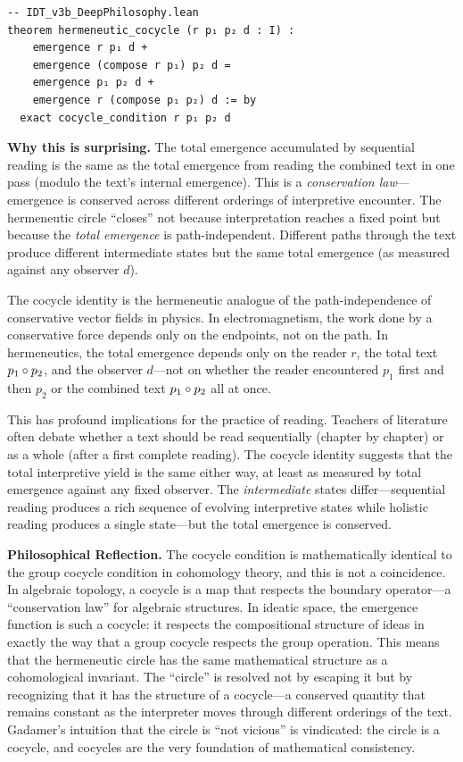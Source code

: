 \begin{lstlisting}
-- IDT_v3b_DeepPhilosophy.lean
theorem hermeneutic_cocycle (r p₁ p₂ d : I) :
    emergence r p₁ d +
    emergence (compose r p₁) p₂ d =
    emergence p₁ p₂ d +
    emergence r (compose p₁ p₂) d := by
  exact cocycle_condition r p₁ p₂ d
\end{lstlisting}

\begin{surprisebox}
\textbf{Why this is surprising.} The total emergence accumulated by
sequential reading is the same as the total emergence from reading the
combined text in one pass (modulo the text's internal emergence). This
is a \emph{conservation law}---emergence is conserved across different
orderings of interpretive encounter. The hermeneutic circle ``closes''
not because interpretation reaches a fixed point but because the
\emph{total emergence} is path-independent. Different paths through
the text produce different intermediate states but the same total
emergence (as measured against any observer $d$).
\end{surprisebox}

The cocycle identity is the hermeneutic analogue of the path-independence
of conservative vector fields in physics. In electromagnetism, the work
done by a conservative force depends only on the endpoints, not on the
path. In hermeneutics, the total emergence depends only on the reader
$r$, the total text $p_1 \circ p_2$, and the observer $d$---not on
whether the reader encountered $p_1$ first and then $p_2$ or the
combined text $p_1 \circ p_2$ all at once.

This has profound implications for the practice of reading. Teachers of
literature often debate whether a text should be read sequentially
(chapter by chapter) or as a whole (after a first complete reading).
The cocycle identity suggests that the total interpretive yield is the
same either way, at least as measured by total emergence against any
fixed observer. The \emph{intermediate} states differ---sequential
reading produces a rich sequence of evolving interpretive states while
holistic reading produces a single state---but the total emergence is
conserved.

\begin{reflectionbox}
\textbf{Philosophical Reflection.}
The cocycle condition is mathematically identical to the group cocycle
condition in cohomology theory, and this is not a coincidence. In
algebraic topology, a cocycle is a map that respects the boundary
operator---a ``conservation law'' for algebraic structures. In ideatic
space, the emergence function is such a cocycle: it respects the
compositional structure of ideas in exactly the way that a group
cocycle respects the group operation. This means that the hermeneutic
circle has the same mathematical structure as a cohomological invariant.
The ``circle'' is resolved not by escaping it but by recognizing that
it has the structure of a cocycle---a conserved quantity that remains
constant as the interpreter moves through different orderings of the
text. Gadamer's intuition that the circle is ``not vicious'' is
vindicated: the circle is a cocycle, and cocycles are the very
foundation of mathematical consistency.
\end{reflectionbox}

